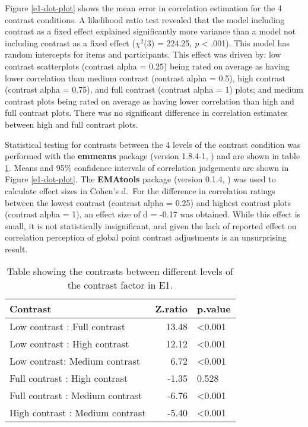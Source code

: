\documentclass[preprint, 3p,
authoryear]{elsarticle} %
\begin{document}
Figure \ref{e1-dot-plot} shows the mean error in correlation estimation
for the 4 contrast conditions. A likelihood ratio test revealed that the
model including contrast as a fixed effect explained significantly more
variance than a model not including contrast as a fixed effect
(\(\chi^2\)(3) = 224.25, \emph{p} \textless{} .001). This model has
random intercepts for items and participants. This effect was driven by:
low contrast scatterplots (contrast alpha = 0.25) being rated on average
as having lower correlation than medium contrast (contrast alpha = 0.5),
high contrast (contrast alpha = 0.75), and full contrast (contrast alpha
= 1) plots; and medium contrast plots being rated on average as having
lower correlation than high and full contrast plots. There was no
significant difference in correlation estimates between high and full
contrast plots.

Statistical testing for contrasts between the 4 levels of the contrast
condition was performed with the \textbf{emmeans} package (version
1.8.4-1, \citealp{emmeans}) and are shown in table
\ref{contrasts-table-e1}. Means and 95\% confidence intervals of
correlation judgements are shown in Figure \ref{e1-dot-plot}. The
\textbf{EMAtools} package (version 0.1.4, \citealp{ematools}) was used
to calculate effect sizes in Cohen's d.~For the difference in
correlation ratings between the lowest contrast (contrast alpha = 0.25)
and highest contrast plots (contrast alpha = 1), an effect size of d =
-0.17 was obtained. While this effect is small, it is not statistically
insignificant, and given the lack of reported effect on correlation
perception of global point contrast adjustments \citep{rensink_2012} is
an unsurprising result.

\begin{table}

\caption{\label{tab:contrasts-table-e1}\label{contrasts-table-e1}Table showing the contrasts between different levels of the contrast factor in E1.}
\centering
\begin{tabular}[t]{lrl}
\toprule
Contrast & Z.ratio & p.value\\
\midrule
Low contrast : Full contrast & 13.48 & <0.001\\
Low contrast : High contrast & 12.12 & <0.001\\
Low contrast: Medium contrast & 6.72 & <0.001\\
Full contrast : High contrast & -1.35 & 0.528\\
Full contrast : Medium contrast & -6.76 & <0.001\\
\addlinespace
High contrast : Medium contrast & -5.40 & <0.001\\
\bottomrule
\end{tabular}
\end{table}
\end{document}
